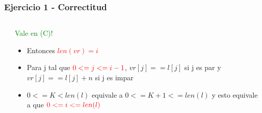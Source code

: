 \begin{frame}[fragile]\frametitle{Ejercicio 1 - Correctitud}
\begin{columns}
\begin{column}{0.35\textwidth}

\end{column}
\begin{column}{0.65\textwidth}


\textcolor{green}{Vale \I en (C)!}
\begin{itemize}
  \item Entonces \textcolor{red}{$len(vr) = i$}
  \item Para j tal que $\textcolor{red}{0 <= j <= i-1}$, $vr[j] == l[j]$ si j es par y $vr[j] == l[j]+n$ si j es impar
  \item $0 <= K < len(l)$ equivale a $0 <= K+1 <= len(l)$ y esto equivale a que $\textcolor{red}{0 <= i <= len(l)}$
\end{itemize}

\end{column}
\end{columns}
\end{frame}


